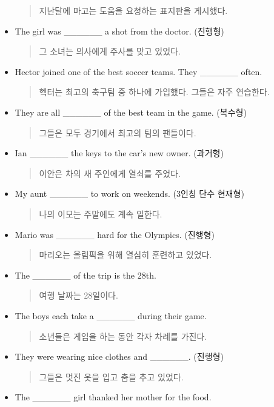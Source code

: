 \documentclass{article}
\begin{document}
\begin{addmargin}[1em]{1em}
\begin{itemize}
    \begin{quote}
    지난달에 마고는 도움을 요청하는 표지판을 게시했다.
    \end{quote}
    \item The girl was \_\_\_\_\_\_ a shot from the doctor. (진행형)
    \begin{quote}
    그 소녀는 의사에게 주사를 맞고 있었다.
    \end{quote}
    \item Hector joined one of the best soccer teams. They \_\_\_\_\_\_ often.
    \begin{quote}
    헥터는 최고의 축구팀 중 하나에 가입했다. 그들은 자주 연습한다.
    \end{quote}
    \item They are all \_\_\_\_\_\_ of the best team in the game. (복수형)
    \begin{quote}
    그들은 모두 경기에서 최고의 팀의 팬들이다.
    \end{quote}
    \newpage
    \item Ian \_\_\_\_\_\_ the keys to the car's new owner. (과거형)
    \begin{quote}
    이안은 차의 새 주인에게 열쇠를 주었다.
    \end{quote}
    \item My aunt \_\_\_\_\_\_ to work on weekends. (3인칭 단수 현재형)
    \begin{quote}
    나의 이모는 주말에도 계속 일한다.
    \end{quote}
    \item Mario was \_\_\_\_\_\_ hard for the Olympics. (진행형)
    \begin{quote}
    마리오는 올림픽을 위해 열심히 훈련하고 있었다.
    \end{quote}
    \item The \_\_\_\_\_\_ of the trip is the 28th.
    \begin{quote}
    여행 날짜는 28일이다.
    \end{quote}
    \item The boys each take a \_\_\_\_\_\_ during their game.
    \begin{quote}
    소년들은 게임을 하는 동안 각자 차례를 가진다.
    \end{quote}
    \item They were wearing nice clothes and \_\_\_\_\_\_. (진행형)
    \begin{quote}
    그들은 멋진 옷을 입고 춤을 추고 있었다.
    \end{quote}
    \item The \_\_\_\_\_\_ girl thanked her mother for the food.

\end{itemize}
\end{addmargin}
\end{document}
